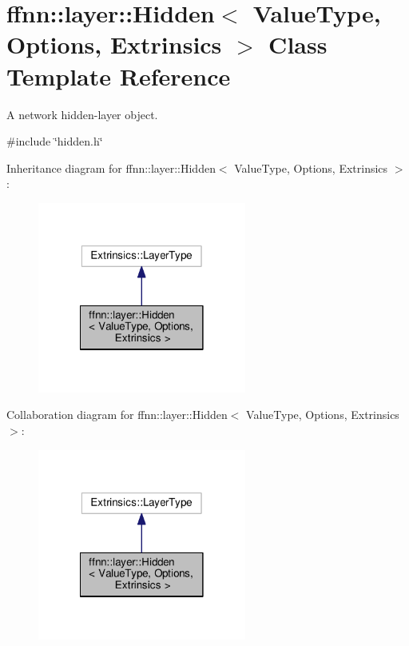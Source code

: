\hypertarget{classffnn_1_1layer_1_1_hidden}{\section{ffnn\-:\-:layer\-:\-:Hidden$<$ Value\-Type, Options, Extrinsics $>$ Class Template Reference}
\label{classffnn_1_1layer_1_1_hidden}
}


A network hidden-\/layer object.  




{\ttfamily \#include \char`\"{}hidden.\-h\char`\"{}}



Inheritance diagram for ffnn\-:\-:layer\-:\-:Hidden$<$ Value\-Type, Options, Extrinsics $>$\-:\nopagebreak
\begin{figure}[H]
\begin{center}
\leavevmode
\includegraphics[width=194pt]{classffnn_1_1layer_1_1_hidden__inherit__graph}
\end{center}
\end{figure}


Collaboration diagram for ffnn\-:\-:layer\-:\-:Hidden$<$ Value\-Type, Options, Extrinsics $>$\-:\nopagebreak
\begin{figure}[H]
\begin{center}
\leavevmode
\includegraphics[width=194pt]{classffnn_1_1layer_1_1_hidden__coll__graph}
\end{center}
\end{figure}
